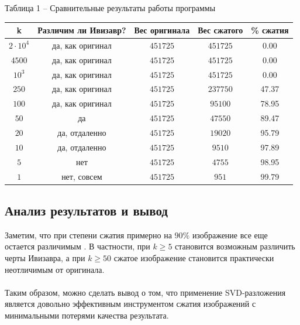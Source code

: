 \documentclass[a5paper, 10pt]{article}
\theoremstyle{definition}
\theoremstyle{plain}
\theoremstyle{remark}
\begin{document}
\begin{center}
Таблица 1 -- Сравнительные результаты работы программы\\

\begin{tabular}{ |c|c|c|c|c| } 
 \hline
k & Различим ли Ивизавр? & Вес оригинала  & Вес сжатого & \% сжатия \\
\hline
$2 \cdot 10^4$ & да, как оригинал & $451725$  & $451725$ & 0.00 \\
 \hline
$4500$ & да, как оригинал & $451725$ & $451725$ & 0.00  \\
 \hline
$10^3$ & да, как оригинал & $451725$ & $451725$ & 0.00  \\
 \hline
$250$ & да, как оригинал & $451725$ & $237750$ & 47.37 \\
 \hline
$100$ & да, как оригинал & $451725$ & $95100$ & 78.95 \\
 \hline
$50$ & да & $451725$ & $47550$ & 89.47 \\
 \hline
$20$ & да, отдаленно & $451725$ & $19020$ & 95.79 \\
 \hline
$10$ & да, отдаленно & $451725$ & $9510$ & 97.89 \\
 \hline
$5$ & нет & $451725$ & $4755$ & 98.95 \\
 \hline
$1$ & нет, совсем & $451725$ & $951$ &  99.79 \\
 \hline
\end{tabular}
\end{center}

\subsection{Анализ результатов и вывод}

Заметим, что при степени сжатия примерно на $90\%$ изображение все еще остается различимым . В частности, при $k \geq 5$ становится возможным различить черты Ивизавра, а при $k \geq 50$ сжатое изображение становится практически неотличимым от оригинала.\\
\\
  Таким образом, можно сделать вывод о том, что применение SVD-разложения является довольно эффективным инструментом сжатия изображений с минимальными потерями качества результата.
\end{document}
